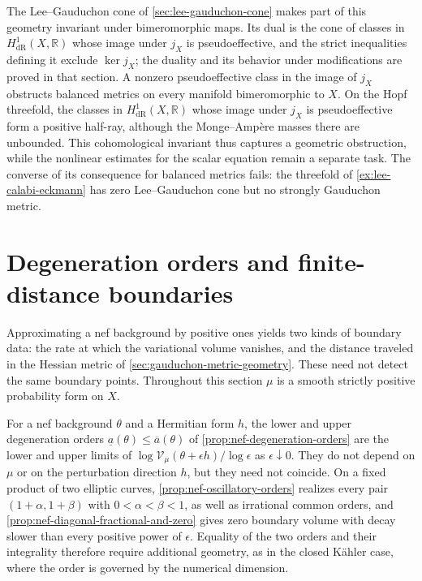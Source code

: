 The Lee--Gauduchon cone of \cref{sec:lee-gauduchon-cone} makes part of this geometry invariant under bimeromorphic maps. Its dual is the cone of classes in $H^1_{\mathrm{dR}}(X,\mathbb R)$ whose image under $j_X$ is pseudoeffective, and the strict inequalities defining it exclude $\ker j_X$; the duality and its behavior under modifications are proved in that section. A nonzero pseudoeffective class in the image of $j_X$ obstructs balanced metrics on every manifold bimeromorphic to $X$. On the Hopf threefold, the classes in $H^1_{\mathrm{dR}}(X,\mathbb R)$ whose image under $j_X$ is pseudoeffective form a positive half-ray, although the Monge--Amp\`ere masses there are unbounded. This cohomological invariant thus captures a geometric obstruction, while the nonlinear estimates for the scalar equation remain a separate task. The converse of its consequence for balanced metrics fails: the threefold of \cref{ex:lee-calabi-eckmann} has zero Lee--Gauduchon cone but no strongly Gauduchon metric.

\section{Degeneration orders and finite-distance boundaries}

Approximating a nef background by positive ones yields two kinds of boundary data: the rate at which the variational volume vanishes, and the distance traveled in the Hessian metric of \cref{sec:gauduchon-metric-geometry}. These need not detect the same boundary points. Throughout this section $\mu$ is a smooth strictly positive probability form on $X$.

For a nef background $\theta$ and a Hermitian form $h$, the lower and upper degeneration orders $\underline a(\theta)\leq\overline a(\theta)$ of \cref{prop:nef-degeneration-orders} are the lower and upper limits of $\log\mathcal V_\mu(\theta+\epsilon h)/\log\epsilon$ as $\epsilon\downarrow0$. They do not depend on $\mu$ or on the perturbation direction $h$, but they need not coincide. On a fixed product of two elliptic curves, \cref{prop:nef-oscillatory-orders} realizes every pair $(1+\alpha,1+\beta)$ with $0<\alpha<\beta<1$, as well as irrational common orders, and \cref{prop:nef-diagonal-fractional-and-zero} gives zero boundary volume with decay slower than every positive power of $\epsilon$. Equality of the two orders and their integrality therefore require additional geometry, as in the closed K\"ahler case, where the order is governed by the numerical dimension.

